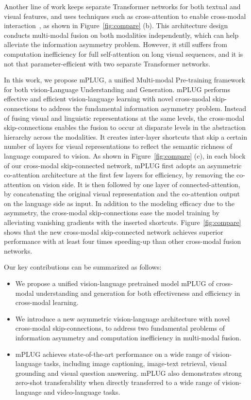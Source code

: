 \documentclass[11pt]{article}
\newcommand{\modelname}{mPLUG }
\begin{document}
Another line of work keeps separate Transformer networks for both textual and visual features, and uses techniques such as cross-attention to enable cross-modal interaction~\cite{dou2021empirical}, as shown in Figure~\ref{fig:compare} (b). This architecture design conducts multi-modal fusion on both modalities independently, which can help alleviate the information asymmetry problem. However, it still suffers from computation inefficiency for full self-attention on long visual sequences, and it is not that parameter-efficient with two separate Transformer networks.



In this work, we propose mPLUG, a unified Multi-modal Pre-training framework for both vision-Language Understanding and Generation. \modelname performs effective and efficient vision-language learning with novel cross-modal skip-connections to address the fundamental information asymmetry problem. Instead of fusing visual and linguistic representations at the same levels, the cross-modal skip-connections enables the fusion to occur at disparate levels in the abstraction hierarchy across the modalities. It creates inter-layer shortcuts that skip a certain number of layers for visual representations to reflect the semantic richness of language compared to vision. As shown in Figure~\ref{fig:compare} (c), in each block of our cross-modal skip-connected network, \modelname first adopts an asymmetric co-attention architecture at the first few layers for efficiency, by removing the co-attention on vision side. It is then followed by one layer of connected-attention, by concatenating the original visual representation and the co-attention output on the language side as input. In addition to the modeling efficacy due to the asymmetry, the cross-modal skip-connections ease the model training by alleviating vanishing gradients with the inserted shortcuts. Figure~\ref{fig:compare} shows that the new cross-modal skip-connected network achieves superior performance with at least four times speeding-up than other cross-modal fusion networks.



Our key contributions can be summarized as follows:
\begin{itemize}
\item
We propose a unified vision-language pretrained model \modelname of cross-modal understanding and generation for both effectiveness and efficiency in cross-modal learning.
\item 
We introduce a new asymmetric vision-language architecture with novel cross-modal skip-connections, to address two fundamental problems of information asymmetry and computation inefficiency in multi-modal fusion.
\item 
\modelname achieves state-of-the-art performance on a wide range of vision-language tasks, including image captioning, image-text retrieval, visual grounding and visual question answering. \modelname also demonstrates strong zero-shot transferability when directly transferred to a wide range of vision-language and video-language tasks.

\end{itemize}
\end{document}
